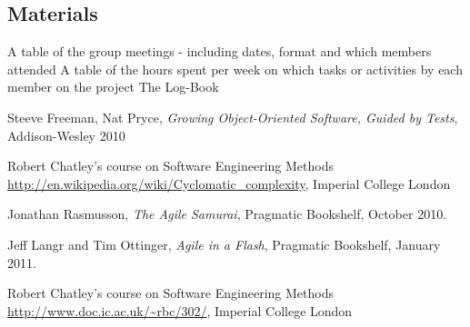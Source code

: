 \documentclass[10pt]{article}
\begin{document}
\subsection{Materials}

A table of the group meetings - including dates, format and which members attended
A table of the hours spent per week on which tasks or activities by each member on the project
The Log-Book

\begin{thebibliography}{9}
  Steeve Freeman, Nat Pryce,
  \emph{Growing Object-Oriented Software, Guided by Tests}, Addison-Wesley 2010

  Robert Chatley's course on Software Engineering Methods
  \url{http://en.wikipedia.org/wiki/Cyclomatic_complexity},
  Imperial College London

  Jonathan Rasmusson,
  \emph{The Agile Samurai},
  Pragmatic Bookshelf,
  October 2010.

  Jeff Langr and Tim Ottinger,
  \emph{Agile in a Flash},
  Pragmatic Bookshelf, 
  January 2011.

  Robert Chatley's course on Software Engineering Methods
  \url{http://www.doc.ic.ac.uk/~rbc/302/},
  Imperial College London

\end{thebibliography}
\end{document}
